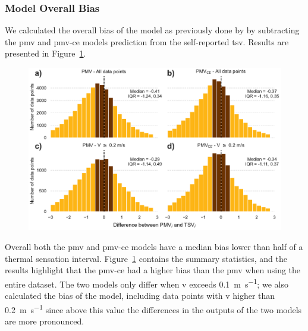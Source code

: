 \subsubsection{Model Overall Bias}\label{subsec:model-overall-bias}
We calculated the overall bias of the model as previously done by  by subtracting the \ac{pmv} and  \ac{pmv-ce} models prediction from the self-reported \ac{tsv}.
Results are presented in Figure~\ref{fig:hist_discrepancies}.
\begin{figure}[htb!]
    \centering
    \includegraphics[width=\textwidth]{figures/hist_discrepancies}
    \caption{}
    \label{fig:hist_discrepancies}
\end{figure} 
Overall both the \ac{pmv} and \ac{pmv-ce} models have a median bias lower than half of a thermal sensation interval.
Figure~\ref{fig:hist_discrepancies} contains the summary statistics, and the results highlight that the \ac{pmv-ce} had a higher bias than the \ac{pmv} when using the entire dataset.
The two models only differ when \ac{v} exceeds \qty{0.1}{\m\per\s}; we also calculated the bias of the model, including data points with \ac{v} higher than \qty{0.2}{\m\per\s} since above this value the differences in the outputs of the two models are more pronounced.
